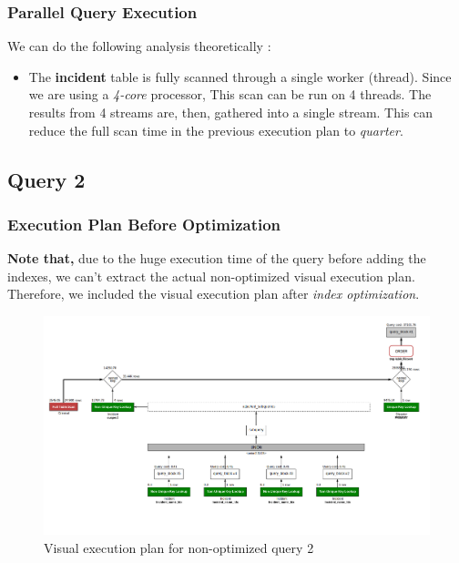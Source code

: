 \subsubsection{Parallel Query Execution}
We can do the following analysis theoretically :
\begin{itemize}
    \item The \textbf{incident} table is fully scanned through a single worker (thread). Since we are using a \emph{4-core} processor, This scan can be run on 4 threads. The results from 4 streams are, then, gathered into a single stream. This can reduce the full scan time in the previous execution plan to \emph{quarter}.  
\end{itemize}

\subsection{Query 2}

\subsubsection{Execution Plan Before Optimization}
\textbf{Note that,} due to the huge execution time of the query before adding the indexes, we can't extract the actual non-optimized visual execution plan. Therefore, we included the visual execution plan after \emph{index optimization}. 
\begin{figure}[H]
    \centering
    \includegraphics[width=\textwidth]{images/execution_plans/q2-2-new.png}
    \caption{Visual execution plan for non-optimized query 2}
\end{figure}

